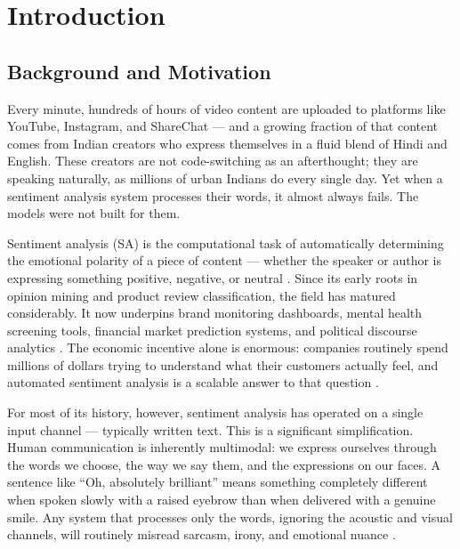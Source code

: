 \chapter{Introduction}
\onehalfspacing

\section{Background and Motivation}

Every minute, hundreds of hours of video content are uploaded to platforms like YouTube, Instagram, and ShareChat --- and a growing fraction of that content comes from Indian creators who express themselves in a fluid blend of Hindi and English. These creators are not code-switching as an afterthought; they are speaking naturally, as millions of urban Indians do every single day. Yet when a sentiment analysis system processes their words, it almost always fails. The models were not built for them.

Sentiment analysis (SA) is the computational task of automatically determining the emotional polarity of a piece of content --- whether the speaker or author is expressing something positive, negative, or neutral \cite{liu2012sentiment}. Since its early roots in opinion mining and product review classification, the field has matured considerably. It now underpins brand monitoring dashboards, mental health screening tools, financial market prediction systems, and political discourse analytics \cite{wankhade2022survey}. The economic incentive alone is enormous: companies routinely spend millions of dollars trying to understand what their customers actually feel, and automated sentiment analysis is a scalable answer to that question \cite{cambria2016affective}.

For most of its history, however, sentiment analysis has operated on a single input channel --- typically written text. This is a significant simplification. Human communication is inherently multimodal: we express ourselves through the words we choose, the way we say them, and the expressions on our faces. A sentence like ``Oh, absolutely brilliant'' means something completely different when spoken slowly with a raised eyebrow than when delivered with a genuine smile. Any system that processes only the words, ignoring the acoustic and visual channels, will routinely misread sarcasm, irony, and emotional nuance \cite{poria2017review}.

